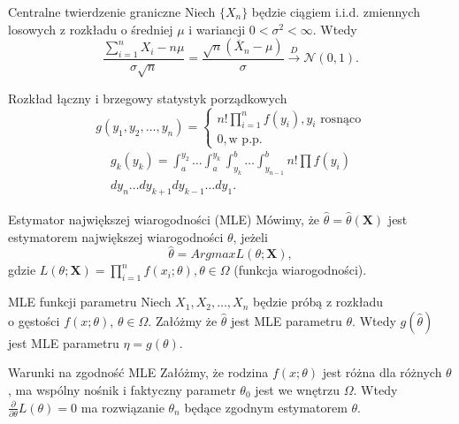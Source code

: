 \documentclass[avery5371, grid, frame]{flashcards}
\begin{document}
\begin{flashcard}[Twierdzenie]{Centralne twierdzenie graniczne}
    Niech $\{X_n\}$ będzie ciągiem i.i.d. zmiennych losowych z rozkładu o średniej $\mu$ i wariancji $0 < \sigma^2 < \infty$. Wtedy $$ \frac{\sum_{i=1}^{n} X_i - n\mu}{\sigma \sqrt{n}} = \frac{\sqrt{n}(\overline{X}_n - \mu)}{\sigma} \xrightarrow{D} \mathcal{N}(0, 1).$$
\end{flashcard}

\begin{flashcard}[Twierdzenie]{Rozkład łączny i brzegowy statystyk porządkowych}
    $$ g(y_1, y_2, \dots, y_n) =
    \begin{cases}
        n! \prod_{i=1}^{n}f(y_i), y_i \text{ rosnąco} \\
        0, \text{w p.p.}
    \end{cases} $$
    \begin{align*}
        g_k(y_k) = \int_a^{y_2} \dots \int_a^{y_k} \int_{y_k}^b \dots \int_{y_{n-1}}^b n! \prod f(y_i) \\ dy_n \dots dy_{k+1} dy_{k-1} \dots dy_1.
    \end{align*}
\end{flashcard}

\begin{flashcard}[Definicja]{Estymator największej wiarogodności (MLE)}
    Mówimy, że $\hat{\theta} = \hat{\theta}(\mathbf{X})$ jest estymatorem największej wiarogodności $\theta$, jeżeli $$ \hat{\theta} = Argmax L(\theta; \mathbf{X}),$$ gdzie $ L(\theta;\textbf{X}) = \prod_{i=1}^n f(x_i; \theta), \theta \in \Omega$ (funkcja wiarogodności).
\end{flashcard}

\begin{flashcard}[Twierdzenie]{MLE funkcji parametru}
    Niech $X_1, X_2, \dots, X_n$ będzie próbą z rozkładu \\ o gęstości $f(x; \theta)$, $\theta \in \Omega$. Załóżmy że $\hat{\theta}$ jest MLE parametru $\theta$. Wtedy $g(\hat{\theta})$ jest MLE parametru $\eta = g(\theta)$.
\end{flashcard}

\begin{flashcard}[Twierdzenie]{Warunki na zgodność MLE}
    Załóżmy, że rodzina $f(x;\theta)$ jest różna dla różnych $\theta$, ma wspólny nośnik i faktyczny parametr $\theta_0$ jest we wnętrzu $\Omega$. Wtedy $ \frac{\partial}{\partial \theta} L(\theta) = 0 $ ma rozwiązanie $\theta_n$ będące zgodnym estymatorem $\theta$.
\end{flashcard}
\end{document}
